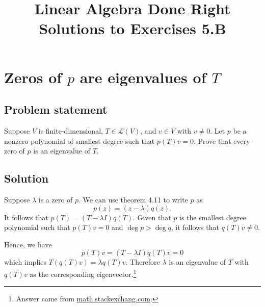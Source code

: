 \documentclass{article}
\title{Linear Algebra Done Right\\Solutions to Exercises 5.B}
\author{}
\date{}
\begin{document}
\maketitle

\renewcommand{\thesection}{9}
\section{Zeros of $p$ are eigenvalues of $T$}
\subsection*{Problem statement}
Suppose $V$ is finite-dimensional, $T\in \mathcal{L}(V)$, and $v\in V$ with $v\neq 0$. Let $p$ be a nonzero polynomial of smallest degree such that $p(T)v=0$. Prove that every zero of $p$ is an eigenvalue of $T$.

\subsection*{Solution}
Suppose $\lambda$ is a zero of $p$. We can use theorem 4.11 to write $p$ as 
\[p(z)=(z-\lambda)q(z).\] 
It follows that $p(T)=(T-\lambda I)q(T)$. Given that $p$ is the smallest degree polynomial such that $p(T)v=0$ and $\operatorname{deg}p>\operatorname{deg}q$, it follows that $q(T)v\neq 0$. 

Hence, we have
\[p(T)v=(T-\lambda I)q(T)v=0\]
which implies $T(q(T)v)=\lambda q(T)v$. Therefore $\lambda$ is an eigenvalue of $T$ with $q(T)v$ as the corresponding eigenvector.\footnote{Answer came from \href{https://math.stackexchange.com/questions/4695496/linear-algebra-done-right-exercise-5-b-9-solution-verification}{math.stackexchang.com}.}
\end{document}
